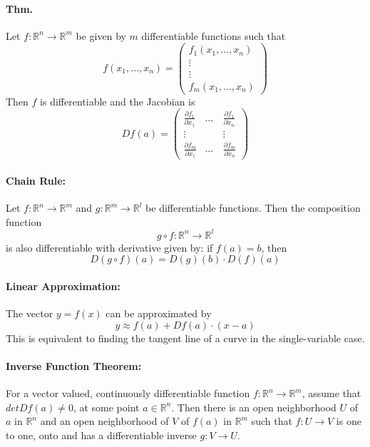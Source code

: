 \documentclass[10pt,a4paper]{article}
\begin{document}
\paragraph{Thm.} Let $f: \mathbb{R}^n \to \mathbb{R}^m$ be given by $m$ differentiable functions such that
$$ f(x_1, \dots, x_n) = 
\begin{pmatrix}
f_1(x_1, \dots, x_n)\\
\vdots\\
\vdots\\
f_m(x_1, \dots, x_n)
\end{pmatrix}$$ 
Then $f$ is differentiable and the Jacobian is
$$ Df(a) = 
\begin{pmatrix}
\frac{\partial f_1}{\partial x_1} & \dots & \frac{\partial f_1}{\partial x_n}\\
\vdots & \quad & \vdots\\
\frac{\partial f_m}{\partial x_1} & \dots & \frac{\partial f_m}{\partial x_n}
\end{pmatrix}$$

\paragraph{Chain Rule:} Let $f: \mathbb{R}^n \to \mathbb{R}^m$ and $g: \mathbb{R}^m \to \mathbb{R}^l$ be differentiable functions. Then the composition function
$$ g \circ f: \mathbb{R}^n \to \mathbb{R}^l$$
is also differentiable with derivative given by: if $f(a) = b$, then
$$ D(g \circ f)(a) = D(g)(b) \cdot D(f)(a)$$

\paragraph{Linear Approximation:} The vector $y = f(x)$ can be approximated by 
$$ y \approx f(a) + Df(a) \cdot (x-a)$$
This is equivalent to finding the tangent line of a curve in the single-variable case.

\paragraph{Inverse Function Theorem:} For a vector valued, continuously differentiable function $f: \mathbb{R}^n \to \mathbb{R}^m$, assume that $detDf(a) \neq 0$, at some point $a\in \mathbb{R}^n$. Then there is an open neighborhood $U$ of $a$ in $\mathbb{R}^n$ and an open neighborhood of $V$ of $f(a)$ in $\mathbb{R}^m$ such that $f: U \to V$ is one to one, onto and has a differentiable inverse $g: V \to U$.
\end{document}
